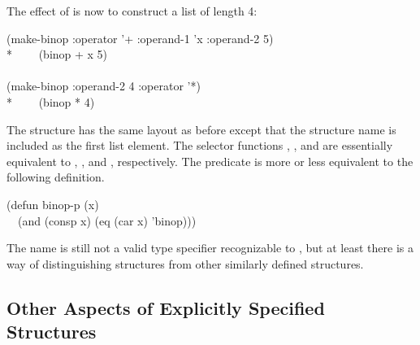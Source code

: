 The effect of  is now to construct a list of length 4:
\begin{lisp}
(make-binop :operator '+ :operand-1 'x :operand-2 5) \\*
~~~\EV\ (binop + x 5) \\
\\
(make-binop :operand-2 4 :operator '*) \\*
~~~\EV\ (binop * {\nil} 4)
\end{lisp}
The structure has the same layout as before except that the structure name
 is included as the first list element.
The selector functions
, ,
and  are essentially equivalent to ,
, and , respectively.
The predicate  is more or less equivalent to the following
definition.
\begin{lisp}
(defun binop-p (x) \\
~~(and (consp x) (eq (car x) 'binop)))
\end{lisp}
The name  is still not a valid type specifier recognizable
to , but at least there is a way of distinguishing 
structures from other similarly defined structures.

\subsection{Other Aspects of Explicitly Specified Structures}
\label{DEFSTRUCT-INITIAL-OFFSET}

